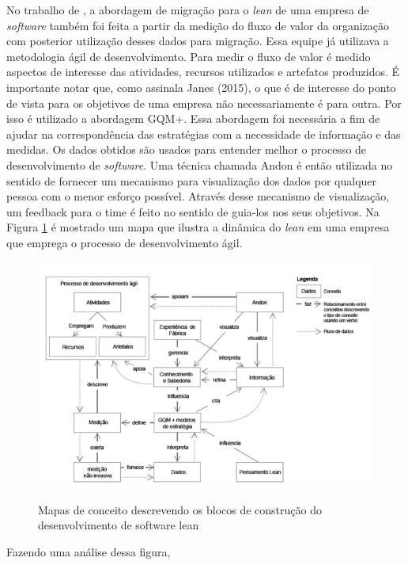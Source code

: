 No trabalho de , a abordagem de migração para o \textit{lean} de uma empresa de \textit{software} também foi feita a partir da medição do fluxo de valor da organização com posterior utilização desses dados para migração. Essa equipe já utilizava a metodologia ágil de desenvolvimento. Para medir o fluxo de valor é medido aspectos de interesse das atividades, recursos utilizados e artefatos produzidos. É importante notar que, como assinala Janes (2015), o que é de interesse do ponto de vista para os objetivos de uma empresa não necessariamente é para outra. Por isso é utilizado a abordagem GQM+. Essa abordagem foi necessária a fim de ajudar na correspondência das estratégias com a necessidade de informação e das medidas. Os dados obtidos são usados para entender melhor o processo de desenvolvimento de \textit{software}. Uma técnica chamada Andon é então utilizada no sentido de fornecer um mecanismo para visualização dos dados por qualquer pessoa com o menor esforço possível. Através desse mecanismo de visualização, um feedback para o time é feito no sentido de guia-los nos seus objetivos. Na Figura \ref{fig:01} é mostrado um mapa que ilustra a dinâmica do \textit{lean} em uma empresa que emprega o processo de desenvolvimento ágil.

\begin{figure}[hb]
\begin{center}
\caption{Mapas de conceito descrevendo os blocos de construção do desenvolvimento de software lean}
\label{fig:01}
\includegraphics[width=13cm]{assets/figura1} \\
\end{center}
\end{figure}

Fazendo uma análise dessa figura, 
